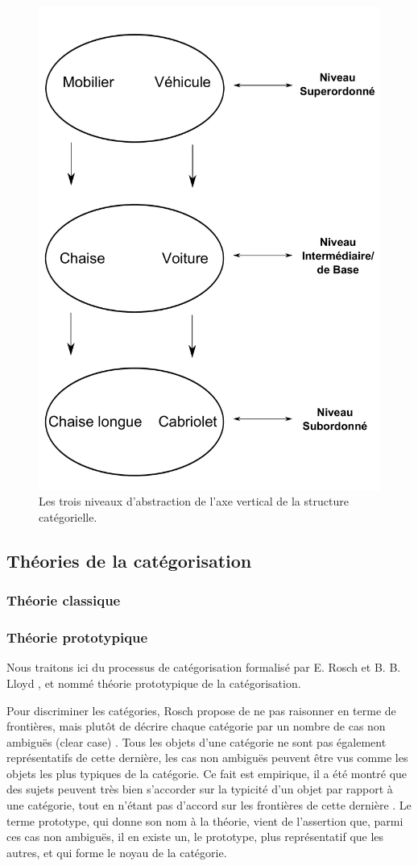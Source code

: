 \begin{figure}[bth]
        \myfloatalign
        \includegraphics[width=.6\linewidth]{gfx/categorieLVL}
        \caption{Les trois niveaux d'abstraction de l'axe vertical de la structure catégorielle.}\label{fig:categorieLVL}
\end{figure}

\subsection{Théories de la catégorisation}


\subsubsection{Théorie classique}

\subsubsection{Théorie prototypique}

Nous traitons ici du processus de catégorisation formalisé par E. Rosch et B. B. Lloyd \citep{rosch1978cognition}, et nommé théorie prototypique de la catégorisation.
 
Pour discriminer les catégories, Rosch propose de ne pas raisonner en terme de frontières, mais plutôt de décrire chaque catégorie par un nombre de cas non ambiguës (clear case) \citep[p. 36]{rosch1978cognition}. Tous les objets d'une catégorie ne sont pas également représentatifs de cette dernière, les cas non ambiguës peuvent être vus comme les objets les plus typiques de la catégorie. Ce fait est empirique, il a été montré que des sujets peuvent très bien s'accorder sur la typicité d'un objet par rapport à une catégorie, tout en n'étant pas d'accord sur les frontières de cette dernière \citep{rosch1974human,rosch1975cognitive}. Le terme prototype, qui donne son nom à la théorie, vient de l'assertion que, parmi ces cas non ambiguës, il en existe un, le prototype, plus représentatif que les autres, et qui forme le noyau de la catégorie.

